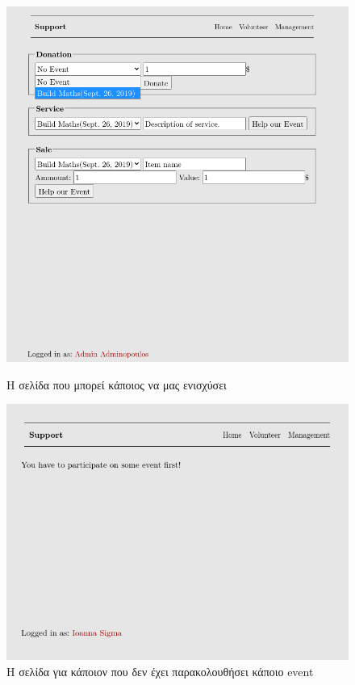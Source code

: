 \documentclass[manuscript,screen,review]{acmart}
\newcommand{\en}[1]{\foreignlanguage{english}{#1}}
\begin{document}
\begin{figure}[H]
\centering
    \includegraphics[width=.5\textwidth]{./images/support_example.png}
    \caption{Η σελίδα που μπορεί κάποιος να μας ενισχύσει}

    \includegraphics[width=.5\textwidth]{./images/support.png}
    \caption{Η σελίδα για κάποιον που δεν έχει παρακολουθήσει κάποιο \en{event}}
   
\end{figure}
\end{document}
